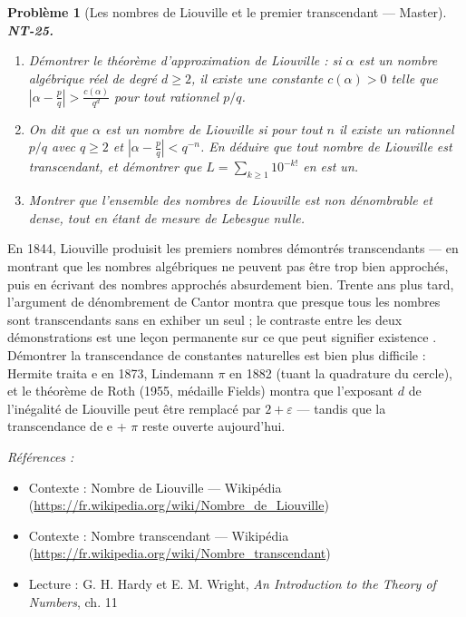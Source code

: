 \documentclass[11pt]{article}
\newtheorem{problem}{Problème}
\newenvironment{refs}{\par\small\noindent\emph{Références :}\begin{itemize}\setlength\itemsep{0pt}}{\end{itemize}\normalsize}
\begin{document}
\bigskip

\begin{problem}[{Les nombres de Liouville et le premier transcendant --- Master}]
\textbf{NT-25.} \begin{enumerate}
\item[(i)] Démontrer le théorème d'approximation de Liouville : si
$\alpha$ est un nombre algébrique réel de degré $d \ge 2$, il existe une constante
$c(\alpha) > 0$ telle que
$\left|\alpha - \frac{p}{q}\right| > \frac{c(\alpha)}{q^d}$ pour tout rationnel
$p/q$.
\item[(ii)] On dit que $\alpha$ est un nombre de Liouville si pour tout $n$ il existe un rationnel
$p/q$ avec $q \ge 2$ et $\left|\alpha - \frac{p}{q}\right| < q^{-n}$. En déduire
que tout nombre de Liouville est transcendant, et démontrer que
$L = \sum_{k \ge 1} 10^{-k!}$ en est un.
\item[(iii)] Montrer que l'ensemble des nombres de Liouville est
non dénombrable et dense, tout en étant de mesure de Lebesgue nulle.
\end{enumerate}

\end{problem}

\noindent En 1844, Liouville produisit les premiers nombres démontrés transcendants ---
en montrant que les nombres algébriques ne peuvent pas être trop bien approchés, puis en écrivant des
nombres approchés absurdement bien. Trente ans plus tard, l'argument de dénombrement de Cantor
montra que presque tous les nombres sont transcendants sans en exhiber un seul ; le contraste entre
les deux démonstrations est une leçon permanente sur ce que peut signifier \og{} existence \fg{}. Démontrer
la transcendance de constantes naturelles est bien plus difficile : Hermite traita e en 1873,
Lindemann $\pi$ en 1882 (tuant la quadrature du cercle), et le théorème de Roth (1955, médaille Fields)
montra que l'exposant $d$ de l'inégalité de Liouville peut être remplacé par
$2 + \varepsilon$ --- tandis que la transcendance de e + $\pi$ reste ouverte aujourd'hui.

\begin{refs}
\item Contexte : Nombre de Liouville --- Wikipédia (\url{https://fr.wikipedia.org/wiki/Nombre_de_Liouville})
\item Contexte : Nombre transcendant --- Wikipédia (\url{https://fr.wikipedia.org/wiki/Nombre_transcendant})
\item Lecture : G. H. Hardy et E. M. Wright, \textit{An Introduction to the Theory of Numbers}, ch. 11
\end{refs}
\end{document}
